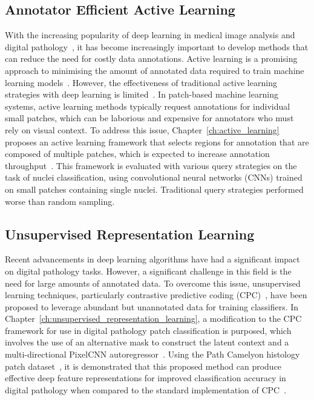 \subsection*{Annotator Efficient Active Learning}
With the increasing popularity of deep learning in medical image analysis and digital pathology~\citep{tizhoosh2018artificial}, it has become increasingly important to develop methods that can reduce the need for costly data annotations. Active learning is a promising approach to minimising the amount of annotated data required to train machine learning models~\citep{settles2009active}. However, the effectiveness of traditional active learning strategies with deep learning is limited~\citep{wang2016cost}. In patch-based machine learning systems, active learning methods typically request annotations for individual small patches, which can be laborious and expensive for annotators who must rely on visual context. To address this issue, Chapter~\ref{ch:active_learning} proposes an active learning framework that selects regions for annotation that are composed of multiple patches, which is expected to increase annotation throughput~\citep{carse2019active}. This framework is evaluated with various query strategies on the task of nuclei classification, using convolutional neural networks (CNNs) trained on small patches containing single nuclei. Traditional query strategies performed worse than random sampling.

\subsection*{Unsupervised Representation Learning}
Recent advancements in deep learning algorithms have had a significant impact on digital pathology tasks. However, a significant challenge in this field is the need for large amounts of annotated data. To overcome this issue, unsupervised learning techniques, particularly contrastive predictive coding (CPC)~\citep{oord2018representation}, have been proposed to leverage abundant but unannotated data for training classifiers. In Chapter~\ref{ch:unsupervised_representation_learning}, a modification to the CPC framework for use in digital pathology patch classification is purposed, which involves the use of an alternative mask to construct the latent context and a multi-directional PixelCNN autoregressor~\citep{oord2016pixel}. Using the Path Camelyon histology patch dataset~\citep{veeling2018rotation}, it is demonstrated that this proposed method can produce effective deep feature representations for improved classification accuracy in digital pathology when compared to the standard implementation of CPC~\citep{carse2021unsupervised}.

